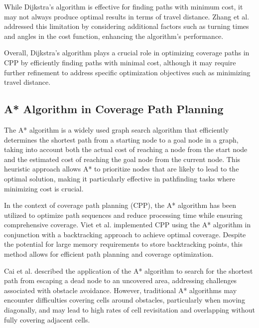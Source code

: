 \vspace*{6mm}

While Dijkstra's algorithm is effective for finding paths with minimum cost, it may not always produce optimal results in terms of travel distance. Zhang et al. addressed this limitation by considering additional factors such as turning times and angles in the cost function, enhancing the algorithm's performance.

\vspace*{6mm}

Overall, Dijkstra's algorithm plays a crucial role in optimizing coverage paths in CPP by efficiently finding paths with minimal cost, although it may require further refinement to address specific optimization objectives such as minimizing travel distance.


\subsection{A* Algorithm in Coverage Path Planning}

The A* algorithm is a widely used graph search algorithm that efficiently determines the shortest path from a starting node to a goal node in a graph, taking into account both the actual cost of reaching a node from the start node and the estimated cost of reaching the goal node from the current node. This heuristic approach allows A* to prioritize nodes that are likely to lead to the optimal solution, making it particularly effective in pathfinding tasks where minimizing cost is crucial.

\vspace*{6mm}

In the context of coverage path planning (CPP), the A* algorithm has been utilized to optimize path sequences and reduce processing time while ensuring comprehensive coverage. Viet et al. implemented CPP using the A* algorithm in conjunction with a backtracking approach to achieve optimal coverage. Despite the potential for large memory requirements to store backtracking points, this method allows for efficient path planning and coverage optimization.

\vspace*{6mm}

Cai et al. described the application of the A* algorithm to search for the shortest path from escaping a dead node to an uncovered area, addressing challenges associated with obstacle avoidance. However, traditional A* algorithms may encounter difficulties covering cells around obstacles, particularly when moving diagonally, and may lead to high rates of cell revisitation and overlapping without fully covering adjacent cells.

